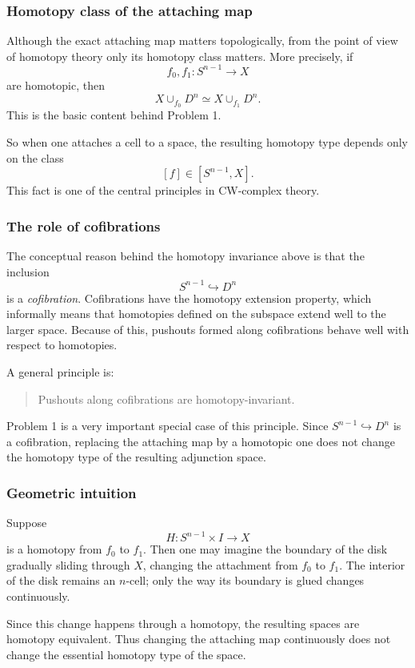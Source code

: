 \documentclass[12pt,a4paper]{article}
\theoremstyle{notespace}
\begin{document}
\subsubsection{Homotopy class of the attaching map}

Although the exact attaching map matters topologically, from the point of view of homotopy theory only its homotopy class matters. More precisely, if
\[
f_0,f_1:S^{n-1}\to X
\]
are homotopic, then
\[
X\cup_{f_0}D^n \simeq X\cup_{f_1}D^n.
\]
This is the basic content behind Problem 1.

So when one attaches a cell to a space, the resulting homotopy type depends only on the class
\[
[f]\in [S^{n-1},X].
\]
This fact is one of the central principles in CW-complex theory.

\subsubsection{The role of cofibrations}

The conceptual reason behind the homotopy invariance above is that the inclusion
\[
S^{n-1}\hookrightarrow D^n
\]
is a \emph{cofibration}. Cofibrations have the homotopy extension property, which informally means that homotopies defined on the subspace extend well to the larger space. Because of this, pushouts formed along cofibrations behave well with respect to homotopies.

A general principle is:

\begin{quote}
	Pushouts along cofibrations are homotopy-invariant.
\end{quote}

Problem 1 is a very important special case of this principle. Since \(S^{n-1}\hookrightarrow D^n\) is a cofibration, replacing the attaching map by a homotopic one does not change the homotopy type of the resulting adjunction space.

\subsubsection{Geometric intuition}

Suppose
\[
H:S^{n-1}\times I\to X
\]
is a homotopy from \(f_0\) to \(f_1\). Then one may imagine the boundary of the disk gradually sliding through \(X\), changing the attachment from \(f_0\) to \(f_1\). The interior of the disk remains an \(n\)-cell; only the way its boundary is glued changes continuously.

Since this change happens through a homotopy, the resulting spaces are homotopy equivalent. Thus changing the attaching map continuously does not change the essential homotopy type of the space.
\end{document}
